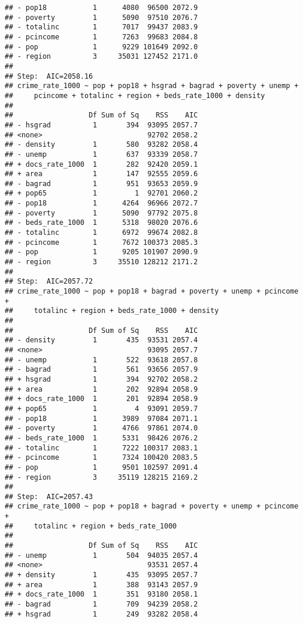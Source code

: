 \documentclass[
  11pt,
]{article}
\begin{document}
\begin{verbatim}
## - pop18           1      4080  96500 2072.9
## - poverty         1      5090  97510 2076.7
## - totalinc        1      7017  99437 2083.9
## - pcincome        1      7263  99683 2084.8
## - pop             1      9229 101649 2092.0
## - region          3     35031 127452 2171.0
## 
## Step:  AIC=2058.16
## crime_rate_1000 ~ pop + pop18 + hsgrad + bagrad + poverty + unemp + 
##     pcincome + totalinc + region + beds_rate_1000 + density
## 
##                  Df Sum of Sq    RSS    AIC
## - hsgrad          1       394  93095 2057.7
## <none>                         92702 2058.2
## - density         1       580  93282 2058.4
## - unemp           1       637  93339 2058.7
## + docs_rate_1000  1       282  92420 2059.1
## + area            1       147  92555 2059.6
## - bagrad          1       951  93653 2059.9
## + pop65           1         1  92701 2060.2
## - pop18           1      4264  96966 2072.7
## - poverty         1      5090  97792 2075.8
## - beds_rate_1000  1      5318  98020 2076.6
## - totalinc        1      6972  99674 2082.8
## - pcincome        1      7672 100373 2085.3
## - pop             1      9205 101907 2090.9
## - region          3     35510 128212 2171.2
## 
## Step:  AIC=2057.72
## crime_rate_1000 ~ pop + pop18 + bagrad + poverty + unemp + pcincome + 
##     totalinc + region + beds_rate_1000 + density
## 
##                  Df Sum of Sq    RSS    AIC
## - density         1       435  93531 2057.4
## <none>                         93095 2057.7
## - unemp           1       522  93618 2057.8
## - bagrad          1       561  93656 2057.9
## + hsgrad          1       394  92702 2058.2
## + area            1       202  92894 2058.9
## + docs_rate_1000  1       201  92894 2058.9
## + pop65           1         4  93091 2059.7
## - pop18           1      3989  97084 2071.1
## - poverty         1      4766  97861 2074.0
## - beds_rate_1000  1      5331  98426 2076.2
## - totalinc        1      7222 100317 2083.1
## - pcincome        1      7324 100420 2083.5
## - pop             1      9501 102597 2091.4
## - region          3     35119 128215 2169.2
## 
## Step:  AIC=2057.43
## crime_rate_1000 ~ pop + pop18 + bagrad + poverty + unemp + pcincome + 
##     totalinc + region + beds_rate_1000
## 
##                  Df Sum of Sq    RSS    AIC
## - unemp           1       504  94035 2057.4
## <none>                         93531 2057.4
## + density         1       435  93095 2057.7
## + area            1       388  93143 2057.9
## + docs_rate_1000  1       351  93180 2058.1
## - bagrad          1       709  94239 2058.2
## + hsgrad          1       249  93282 2058.4

\end{verbatim}
\end{document}
